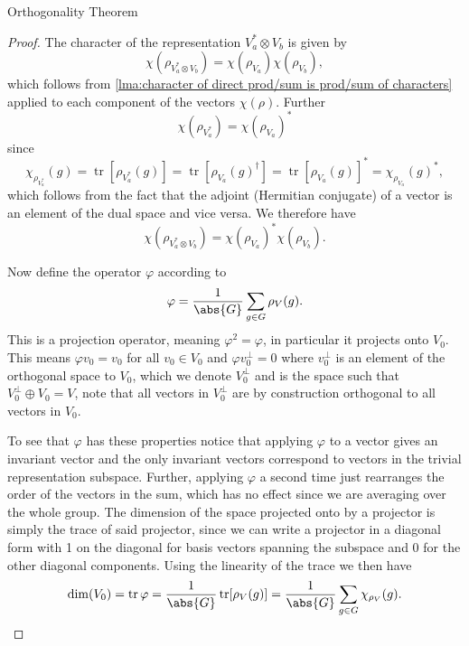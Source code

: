 \documentclass[fleqn]{NotesClass}
\newcommand*{\hermit}{\dagger}
\DeclareMathOperator{\tr}{tr}
\newcommand*{\directsum}{\oplus}
\newcommand*{\directproduct}{\otimes}
\begin{document}
\begin{thm}{Orthogonality Theorem}{}
\begin{proof}
            The character of the representation \(V_a^* \directproduct V_b\) is given by
            \begin{equation}
                \chi(\rho_{V_a^* \directproduct V_b}) = \chi(\rho_{V_a}) \chi(\rho_{V_b}),
            \end{equation}
            which follows from \cref{lma:character of direct prod/sum is prod/sum of characters} applied to each component of the vectors \(\chi(\rho)\).
            Further
            \begin{equation}
                \chi(\rho_{V_a^*}) = \chi(\rho_{V_a})^*
            \end{equation}
            since
            \begin{equation}
                \chi_{\rho_{V_a^*}}(g) = \tr[\rho_{V_a^*}(g)] = \tr[\rho_{V_a}(g)^\hermit] = \tr[\rho_{V_a}(g)]^* = \chi_{\rho_{V_a}}(g)^*,
            \end{equation}
            which follows from the fact that the adjoint (Hermitian conjugate) of a vector is an element of the dual space and vice versa.
            We therefore have
            \begin{equation}
                \chi(\rho_{V_a^* \directproduct V_b}) = \chi(\rho_{V_a})^*\chi(\rho_{V_b}).
            \end{equation}
            
            Now define the operator \(\varphi\) according to
            \begin{equation}
                \varphi = \frac{1}{\abs{G}} \sum_{g \in G} \rho_V(g).
            \end{equation}
            This is a projection operator, meaning \(\varphi^2 = \varphi\), in particular it projects onto \(V_0\).
            This means \(\varphi v_0 = v_0\) for all \(v_0 \in V_0\) and \(\varphi v_0^\perp = 0\) where \(v_0^\perp\) is an element of the orthogonal space to \(V_0\), which we denote \(V_0^\perp\) and is the space such that \(V_0^\perp \directsum V_0 = V\), note that all vectors in \(V_0^\perp\) are by construction orthogonal to all vectors in \(V_0\).
            
            To see that \(\varphi\) has these properties notice that applying \(\varphi\) to a vector gives an invariant vector and the only invariant vectors correspond to vectors in the trivial representation subspace.
            Further, applying \(\varphi\) a second time just rearranges the order of the vectors in the sum, which has no effect since we are averaging over the whole group.
            The dimension of the space projected onto by a projector is simply the trace of said projector, since we can write a projector in a diagonal form with 1 on the diagonal for basis vectors spanning the subspace and 0 for the other diagonal components.
            Using the linearity of the trace we then have
            \begin{equation}
                \dim(V_0) = \tr \varphi = \frac{1}{\abs{G}} \tr[\rho_V(g)] = \frac{1}{\abs{G}} \sum_{g \in G} \chi_{\rho_V}(g).
            \end{equation}
            

\end{proof}
\end{thm}
\end{document}
